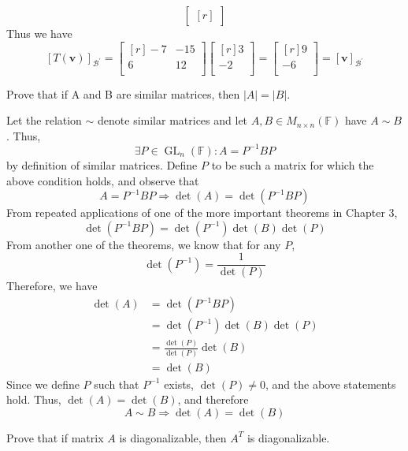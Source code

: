 \documentclass{article}
\theoremstyle{definition}
\renewenvironment{proof}[1][\proofname]{\begin{replacementproof}}{\end{replacementproof}}
\newenvironment{solution}[1][]{\begin{replacementsoln}}{\end{replacementsoln}}
\begin{document}
\begin{solution}
\[\begin{bmatrix}[r]
    \end{bmatrix}
  \]
  Thus we have
  \[
    [T(\mathbf{v})]_{\mathcal{B} ^{\prime} } = \begin{bmatrix}[r]
      -7 &-15   \\
       6&12   \\
    \end{bmatrix} \begin{bmatrix}[r]
       3 \\
       -2 \\
    \end{bmatrix}=\begin{bmatrix}[r]
       9 \\
       -6 \\
    \end{bmatrix} = [\mathbf{v}]_{\mathcal{B} ^{\prime} }
  \]
\end{solution}
\begin{exercise}
  Prove that if A and B are similar matrices, then $|A| =|B|$.
\end{exercise}
\begin{proof}
  Let the relation \(\sim \) denote similar matrices and let \(A,B\in M_{n\times n}(\mathbb{F}) \) have \(A\sim B\). Thus,
  \[
    \exists P\in \operatorname{GL}_n(\mathbb{F}) : A = P ^{-1} BP
  \]
  by definition of similar matrices. Define \(P\) to be such a matrix for which the above condition holds, and observe that
  \[
    A = P ^{-1} BP \Longrightarrow \det (A)=\det \left( P ^{-1} BP \right)
  \]
  From repeated applications of one of the more important theorems in Chapter 3,
  \[
    \det \left( P ^{-1} BP \right) = \det \left( P ^{-1}  \right) \det (B)\det (P)
  \]
  From another one of the theorems, we know that for any \(P\),
  \[
    \det \left( P ^{-1}  \right) = \frac{1}{\det (P)}
  \]
  Therefore, we have
  \begin{align*}
     \det (A)&=\det \left( P ^{-1} BP \right)\\
    &=\det \left( P ^{-1}  \right) \det (B)\det (P)\\
    &=\frac{\det (P)}{\det (P)}\det (B)\\
    &=\det (B)
  \end{align*}
  Since we define \(P\) such that \(P ^{-1} \) exists, \(\det (P)\neq 0\), and the above statements hold. Thus, \(\det (A)=\det (B)\), and therefore
  \[
    A \sim B \Longrightarrow \det (A) = \det (B)
  \]
\end{proof}
\begin{exercise}
  Prove that if matrix $A$ is diagonalizable, then $A^T$ is diagonalizable.
\end{exercise}
\end{document}
